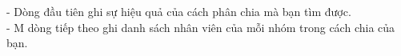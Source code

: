 - Dòng đầu tiên ghi sự hiệu quả của cách phân chia mà bạn tìm được.   
\\   - M dòng tiếp theo ghi danh sách nhân viên của mỗi nhóm trong cách chia của bạn.
